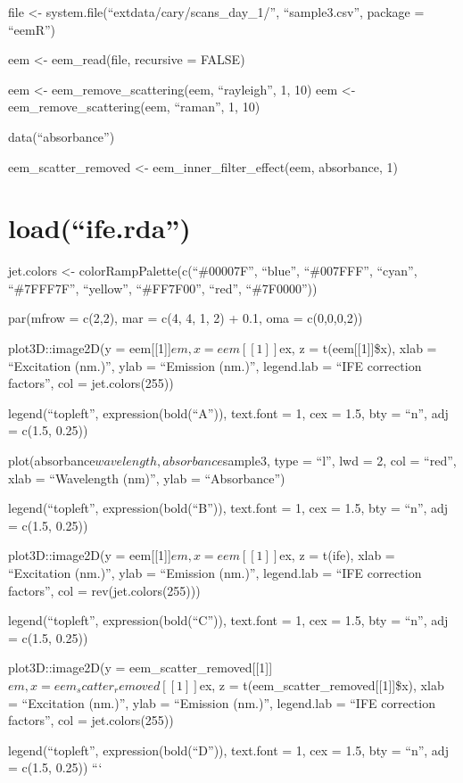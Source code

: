 \documentclass[]{book}
\theoremstyle{definition}
\theoremstyle{definition}
\theoremstyle{remark}
\begin{document}
file \textless{}- system.file(``extdata/cary/scans\_day\_1/'',
``sample3.csv'', package = ``eemR'')

eem \textless{}- eem\_read(file, recursive = FALSE)

eem \textless{}- eem\_remove\_scattering(eem, ``rayleigh'', 1, 10) eem
\textless{}- eem\_remove\_scattering(eem, ``raman'', 1, 10)

data(``absorbance'')

eem\_scatter\_removed \textless{}- eem\_inner\_filter\_effect(eem,
absorbance, 1)

\chapter{\texorpdfstring{load(``ife.rda'')}{load(ife.rda)}}\label{loadife.rda}

jet.colors \textless{}- colorRampPalette(c(``\#00007F'', ``blue'',
``\#007FFF'', ``cyan'', ``\#7FFF7F'', ``yellow'', ``\#FF7F00'', ``red'',
``\#7F0000''))

par(mfrow = c(2,2), mar = c(4, 4, 1, 2) + 0.1, oma = c(0,0,0,2))

plot3D::image2D(y = eem{[}{[}1{]}{]}\(em,  x = eem[[1]]\)ex, z =
t(eem{[}{[}1{]}{]}\$x), xlab = ``Excitation (nm.)'', ylab = ``Emission
(nm.)'', legend.lab = ``IFE correction factors'', col = jet.colors(255))

legend(``topleft'', expression(bold(``A'')), text.font = 1, cex = 1.5,
bty = ``n'', adj = c(1.5, 0.25))

plot(absorbance\(wavelength,  absorbance\)sample3, type = ``l'', lwd =
2, col = ``red'', xlab = ``Wavelength (nm)'', ylab = ``Absorbance'')

legend(``topleft'', expression(bold(``B'')), text.font = 1, cex = 1.5,
bty = ``n'', adj = c(1.5, 0.25))

plot3D::image2D(y = eem{[}{[}1{]}{]}\(em,  x = eem[[1]]\)ex, z = t(ife),
xlab = ``Excitation (nm.)'', ylab = ``Emission (nm.)'', legend.lab =
``IFE correction factors'', col = rev(jet.colors(255)))

legend(``topleft'', expression(bold(``C'')), text.font = 1, cex = 1.5,
bty = ``n'', adj = c(1.5, 0.25))

plot3D::image2D(y =
eem\_scatter\_removed{[}{[}1{]}{]}\(em,  x = eem_scatter_removed[[1]]\)ex,
z = t(eem\_scatter\_removed{[}{[}1{]}{]}\$x), xlab = ``Excitation
(nm.)'', ylab = ``Emission (nm.)'', legend.lab = ``IFE correction
factors'', col = jet.colors(255))

legend(``topleft'', expression(bold(``D'')), text.font = 1, cex = 1.5,
bty = ``n'', adj = c(1.5, 0.25)) ```
\end{document}
